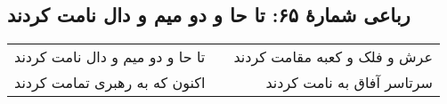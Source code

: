 \begin{center}
\section*{رباعی شمارهٔ ۶۵: تا حا و دو میم و دال نامت کردند}
\label{sec:065}
\begin{longtable}{l p{0.5cm} r}
تا حا و دو میم و دال نامت کردند
&&
عرش و فلک و کعبه مقامت کردند
\\
اکنون که به رهبری تمامت کردند
&&
سرتاسر آفاق به نامت کردند
\\
\end{longtable}
\end{center}
